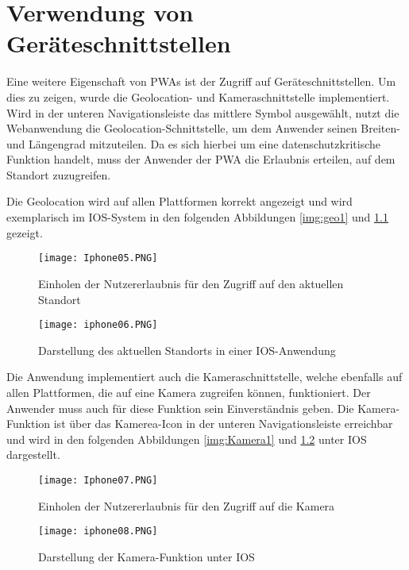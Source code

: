 \chapter{Verwendung von Geräteschnittstellen}

Eine weitere Eigenschaft von PWAs ist der Zugriff auf Geräteschnittstellen. Um dies zu zeigen, wurde die Geolocation- und Kameraschnittstelle implementiert.
Wird in der unteren Navigationsleiste das mittlere Symbol ausgewählt, nutzt die Webanwendung die Geolocation-Schnittstelle, um dem Anwender seinen Breiten- und Längengrad mitzuteilen. Da es sich hierbei um eine datenschutzkritische Funktion handelt, muss der Anwender der PWA die Erlaubnis erteilen, auf dem Standort zuzugreifen. 

Die Geolocation wird auf allen Plattformen korrekt angezeigt und wird exemplarisch im IOS-System in den folgenden Abbildungen \ref{img:geo1} und \ref{img:geo2} gezeigt. 

\begin{figure}[!htb]
    \begin{minipage}[b]{.4\linewidth} %
       \texttt{[image: Iphone05.PNG]}
       \caption{Einholen der Nutzererlaubnis für den Zugriff auf den aktuellen Standort}
       \label{img:geo1}
    \end{minipage}
    \hspace{.1\linewidth}%
    \begin{minipage}[b]{.4\linewidth} %
       \texttt{[image: iphone06.PNG]}
       \caption{Darstellung des aktuellen Standorts in einer IOS-Anwendung}
       \label{img:geo2}
    \end{minipage}
 \end{figure}

 Die Anwendung implementiert auch die Kameraschnittstelle, welche ebenfalls auf allen Plattformen, die auf eine Kamera zugreifen können, funktioniert. Der Anwender muss auch für diese Funktion sein Einverständnis geben. Die Kamera-Funktion ist über das Kamerea-Icon in der unteren Navigationsleiste erreichbar und wird in den folgenden Abbildungen \ref{img:Kamera1} und \ref{img:Kamera2} unter IOS dargestellt.

 \begin{figure}[!htb]
    \begin{minipage}[b]{.4\linewidth} %
       \texttt{[image: Iphone07.PNG]}
       \caption{Einholen der Nutzererlaubnis für den Zugriff auf die Kamera}
       \label{img:Kamera1}
    \end{minipage}
    \hspace{.1\linewidth}%
    \begin{minipage}[b]{.4\linewidth} %
       \texttt{[image: iphone08.PNG]}
       \caption{Darstellung der Kamera-Funktion unter IOS}
       \label{img:Kamera2}
    \end{minipage}
 \end{figure}



